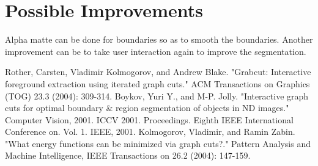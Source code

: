 \documentclass[a4paper]{article}
\begin{document}
\section{Possible Improvements}
Alpha matte can be done for boundaries so as to smooth the boundaries. Another improvement can be to take user interaction again to improve the segmentation.

\begin{thebibliography}{10}

 Rother, Carsten, Vladimir Kolmogorov, and Andrew Blake. "Grabcut: Interactive foreground extraction using iterated graph cuts." ACM Transactions on Graphics (TOG) 23.3 (2004): 309-314.
 Boykov, Yuri Y., and M-P. Jolly. "Interactive graph cuts for optimal boundary \& region segmentation of objects in ND images." Computer Vision, 2001. ICCV 2001. Proceedings. Eighth IEEE International Conference on. Vol. 1. IEEE, 2001.
 Kolmogorov, Vladimir, and Ramin Zabin. "What energy functions can be minimized via graph cuts?." Pattern Analysis and Machine Intelligence, IEEE Transactions on 26.2 (2004): 147-159.
\end{thebibliography}
\end{document}
